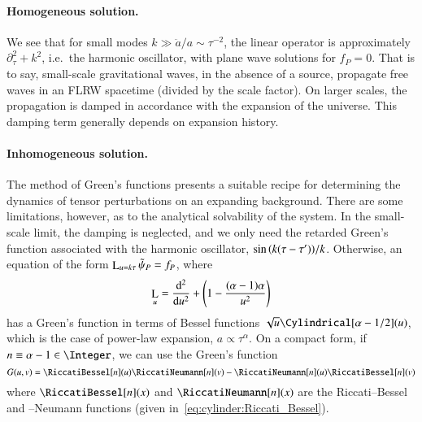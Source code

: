 
    \paragraph{Homogeneous solution.} %
    We see that for small modes $k \gg \ddot{a}/a \sim \tau^{-2}$, the linear operator is approximately $\partial_\tau^2 + k^2$, i.e.~the harmonic oscillator, with plane wave solutions for $f_P=0$. That is to say, small-scale gravitational waves, in the absence of a source, propagate free waves in an FLRW spacetime (divided by the scale factor). On larger scales, the propagation is damped in accordance with the expansion of the universe. This damping term generally depends on expansion history.


    


    \paragraph{Inhomogeneous solution.} %
    The method of Green's functions presents a suitable recipe for determining the dynamics of tensor perturbations on an expanding background. There are some limitations, however, as to the analytical solvability of the system. In the small-scale limit, the damping is neglected, and we only need the retarded Green's function associated with the harmonic oscillator, $\sin{{\left( k(\tau-\tau') \right)}}/k$. Otherwise, an equation of the form $\mathop{\mathrm{L}}_{u=k\tau} \tilde{\psi}_P=f_P$, where
    \begin{equation}
        \mathop{\mathrm{L}}_u = \dv[2]{}{u} + {\left( 1 - \frac{(\alpha-1)\alpha}{u^2} \right)}
    \end{equation}
    has a Green's function in terms of Bessel functions $\sqrt{u}\Cylindrical[\alpha-1/2](u)$, which is the case of power-law expansion, $a \propto \tau^\alpha$. On a compact form, if $n\equiv\alpha-1 \in \Integer$, we can use the Green's function
    \begin{equation}\label{eq:GR:gws:Greens_function_n}
        G(u,v) = \RiccatiBessel[n](u)\RiccatiNeumann[n](v) - \RiccatiNeumann[n](u)\RiccatiBessel[n](v)
    \end{equation}
    where $\RiccatiBessel[n](x)$ and $\RiccatiNeumann[n](x)$ are the Riccati--Bessel and --Neumann functions (given in~\cref{eq:cylinder:Riccati_Bessel}).
        
